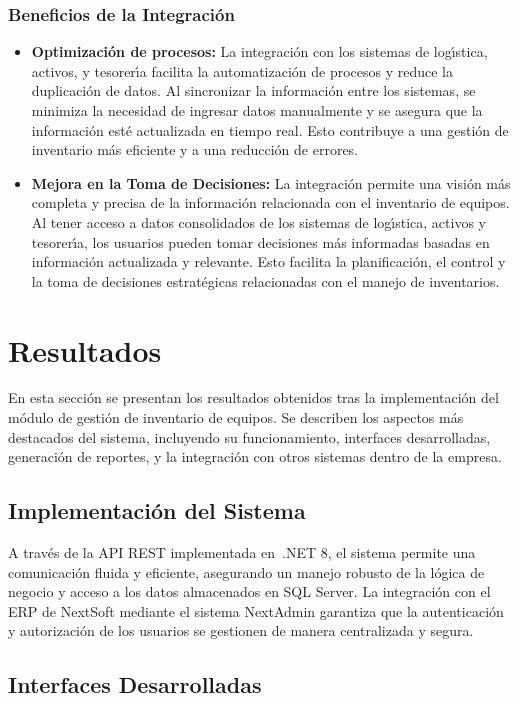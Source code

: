 \documentclass[stu, 12pt, letterpaper, donotrepeattitle, floatsintext, natbib]{apa7}
\begin{document}
\subsubsection{Beneficios de la Integraci\'on}
\begin{itemize}
    \item\textbf{Optimizaci\'on de procesos: }La integraci\'on con los sistemas de log\'{\i}stica, activos, y tesorer\'{\i}a facilita la automatizaci\'on de procesos y reduce la duplicaci\'on de datos. Al sincronizar la informaci\'on entre los sistemas, se minimiza la necesidad de ingresar datos manualmente y se asegura que la informaci\'on est\'e actualizada en tiempo real. Esto contribuye a una gesti\'on de inventario m\'as eficiente y a una reducci\'on de errores.
    \item\textbf{Mejora en la Toma de Decisiones: }La integraci\'on permite una visi\'on m\'as completa y precisa de la informaci\'on relacionada con el inventario de equipos. Al tener acceso a datos consolidados de los sistemas de log\'{\i}stica, activos y tesorer\'{\i}a, los usuarios pueden tomar decisiones m\'as informadas basadas en informaci\'on actualizada y relevante. Esto facilita la planificaci\'on, el control y la toma de decisiones estrat\'egicas relacionadas con el manejo de inventarios.
\end{itemize}
\newpage
\section{Resultados}
En esta secci\'on se presentan los resultados obtenidos tras la implementaci\'on del m\'odulo de gesti\'on de inventario de equipos. Se describen los aspectos m\'as destacados del sistema, incluyendo su funcionamiento, interfaces desarrolladas, generaci\'on de reportes, y la integraci\'on con otros sistemas dentro de la empresa.
\subsection{Implementaci\'on del Sistema}
A trav\'es de la API REST implementada en~.NET 8, el sistema permite una comunicaci\'on fluida y eficiente, asegurando un manejo robusto de la l\'ogica de negocio y acceso a los datos almacenados en SQL Server. La integraci\'on con el ERP de NextSoft mediante el sistema NextAdmin garantiza que la autenticaci\'on y autorizaci\'on de los usuarios se gestionen de manera centralizada y segura.
\subsection{Interfaces Desarrolladas}
\end{document}
